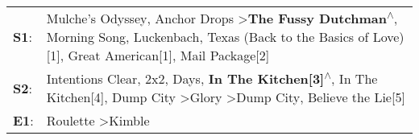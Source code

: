 \begin{supertabular}{p{0.03\textwidth}p{0.92\textwidth}}
 \textbf{S1}:  &                                  Mulche's Odyssey\textsuperscript{}, \enspace Anchor Drops\textsuperscript{} \textgreater \enspace \textbf{The Fussy Dutchman\textsuperscript{$\wedge$}}, \enspace Morning Song\textsuperscript{}, \enspace Luckenbach, Texas (Back to the Basics of Love)[1]\textsuperscript{}, \enspace Great American[1]\textsuperscript{}, \enspace Mail Package[2]\textsuperscript{}  \enspace  \\
 \textbf{S2}:  &  Intentions Clear\textsuperscript{}, \enspace 2x2\textsuperscript{},  Days\textsuperscript{}, \enspace \textbf{In The Kitchen[3]\textsuperscript{$\wedge$}}, \enspace In The Kitchen[4]\textsuperscript{}, \enspace Dump City\textsuperscript{} \textgreater \enspace Glory\textsuperscript{} \textgreater \enspace Dump City\textsuperscript{}, \enspace Believe the Lie[5]\textsuperscript{}  \enspace  \\
 \textbf{E1}:  &                                                                                                                                                                                                                                                                                                                                 Roulette\textsuperscript{} \textgreater \enspace Kimble\textsuperscript{}  \enspace  \\
\end{supertabular}
